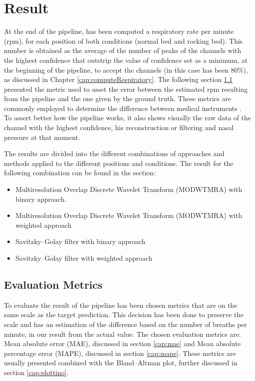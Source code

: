 

\chapter{Result}

At the end of the pipeline, has been computed a respiratory rate per minute (rpm), for each position of both conditions (normal bed and rocking bed). This number is obtained as the average of the number of peaks of the channels with the highest confidence that outstrip the value of confidence set as a minimum, at the beginning of the pipeline, to accept the channels (in this case has been 80\%), as discussed in Chapter \ref{cap:computeRespiratory}. 
The following section \ref{cap:metrics} presented the metric used to asset the error between the estimated rpm resulting from the pipeline and the one given by the ground truth. These metrics are commonly employed to determine the difference between medical instruments \cite{Hunt2015IdentificationExercise,HoogAntink2020BallistocardiographyIntervention, Sadek2020AStudy}.
To assert better how the pipeline works, it also shows visually the raw data of the channel with the highest confidence, his reconstruction or filtering and nasal pressure at that moment.

The results are divided into the different combinations of approaches and methods applied to the different positions and conditions.
The result for the following combination can be found in the section:
\begin{itemize}
  \item   Multiresolution Overlap Discrete Wavelet Transform  (MODWTMRA) with binary approach.
  \item  Multiresolution Overlap Discrete Wavelet Transform  (MODWTMRA) with weighted approach
  \item Savitzky–Golay filter with binary approach
  \item  Savitzky–Golay filter with weighted approach   
\end{itemize}



\section{Evaluation Metrics} \label{cap:metrics}
To evaluate the result of the pipeline has been chosen metrics that are on the same scale as the target prediction. This decision has been done to preserve the scale and has an estimation of the difference based on the number of breaths per minute, in our result from the actual value.
The chosen evaluation metrics are: Mean absolute error (MAE), discussed in section \ref{cap:mae} and Mean absolute percentage error (MAPE), discussed in section \ref{cap:mape}. These metrics are usually presented combined with the Bland–Altman plot, further discussed in section \ref{cap:plottino}.


